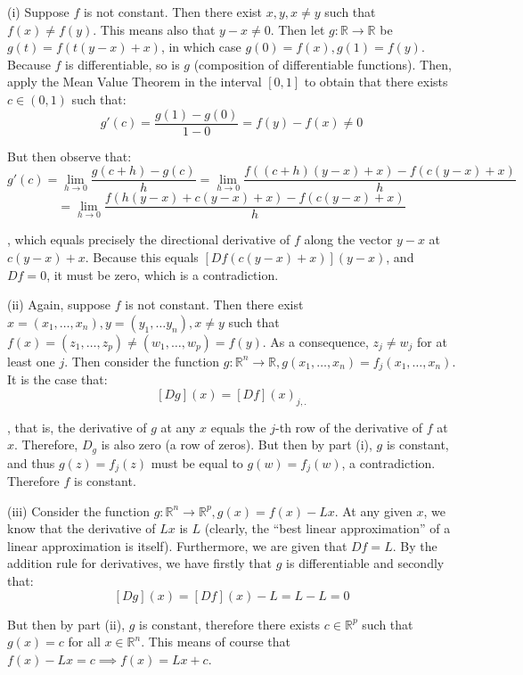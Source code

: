 \begin{solution}

    (i) Suppose $f$ is not constant. Then there exist $x, y, x \neq y$ such that $f(x) \neq f(y)$. This means also that $y - x \neq 0$. Then let $g: \mathbb{R} \rightarrow \mathbb{R}$ be $g(t) = f(t(y - x) + x)$, in which case $g(0) = f(x), g(1) = f(y)$. Because $f$ is differentiable, so is $g$ (composition of differentiable functions). Then, apply the Mean Value Theorem in the interval $[0, 1]$ to obtain that there exists $c \in (0, 1)$ such that:
    $$g'(c) = \frac{g(1) -g(0)}{1 - 0} = f(y) - f(x) \neq 0$$

    But then observe that:
    $$g'(c) = \lim_{h \rightarrow 0} \frac{g(c + h) - g(c)}{h} = \lim_{h \rightarrow 0} \frac{f((c+h)(y - x) +x) - f(c(y - x) + x)}{h}$$
    $$ = \lim_{h \rightarrow 0}  \frac{f(h(y -x) + c(y - x) + x) - f(c(y - x) + x)}{h}$$

    , which equals precisely the directional derivative of $f$ along the vector $y - x$ at $c(y - x) + x$. Because this equals $[D f(c(y -x) +x)](y - x)$, and $D f = 0$, it must be zero, which is a contradiction.

    (ii) Again, suppose $f$ is not constant. Then there exist $x = (x_1, \ldots, x_n), y = (y_1, \ldots y_n), x \neq y$ such that $f(x) = (z_1, \ldots, z_p) \neq (w_1, \ldots, w_p) = f(y)$. As a consequence, $z_j \neq w_j$ for at least one $j$. Then consider the function $g: \mathbb{R}^n \rightarrow \mathbb{R}, g(x_1, \ldots, x_n) = f_j (x_1, \ldots, x_n)$. It is the case that:
    $$[D g] (x)= [D f] (x)_{j, .}$$

    , that is, the derivative of $g$ at any $x$ equals the $j$-th row of the derivative of $f$ at $x$. Therefore, $D_g$ is also zero (a row of zeros). But then by part (i), $g$ is constant, and thus $g(z) = f_j(z)$ must be equal to $g(w) = f_j(w)$, a contradiction. Therefore $f$ is constant.

    (iii) Consider the function $g: \mathbb{R}^n \rightarrow \mathbb{R}^p, g(x) = f(x) - Lx$. At any given $x$, we know that the derivative of $Lx$ is $L$ (clearly, the ``best linear approximation'' of a linear approximation is itself). Furthermore, we are given that $D f = L$. By the addition rule for derivatives, we have firstly that $g$ is differentiable and secondly that:
    $$[D g](x) = [D f](x) - L = L - L = 0$$

    But then by part (ii), $g$ is constant, therefore there exists $c \in \mathbb{R}^p$ such that $g(x) = c$ for all $x \in \mathbb{R}^n$. This means of course that $f(x) - Lx = c \implies f(x) = Lx + c$.
\end{solution}

